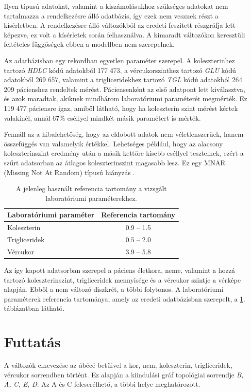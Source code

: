 Ilyen típusú adatokat, valamint a kiszámolásukhoz szükséges adatokat nem tartalmazza a rendelkezésre álló adatbázis, így ezek nem vesznek részt a kísérletben. A rendelkezésre álló változókból az eredeti feszített részgráfja lett képezve, ez volt a kísérletek során felhasználva. A kimaradt változókon keresztüli feltételes függőségek ebben a modellben nem szerepelnek.

Az adatbázisban egy rekordban egyetlen paraméter szerepel. A koleszterinhez tartozó \emph{HDLC} kódú adatokból 177 473, a vércukorszinthez tartozó \emph{GLU} kódú adatokból 269 657, valamint a trigliceridekhez tartozó \emph{TGL} kódú adatokból 264 209 pácienshez rendeltek mérést. Páciensenként az első adatpont lett kiválasztva, és azok maradtak, akiknek mindhárom laboratóriumi paraméterét  megmérték. Ez 119 477 páciensre igaz, amiből látható, hogy ha koleszterin szint mérést kértek valakinél, annál 67\% eséllyel mindkét másik paramétert is mérték.

Fennáll az a hibalehetőség, hogy az eldobott adatok nem véletlenszerűek, hanem összefüggés van valamelyik értékkel. Lehetséges például, hogy az alacsony koleszterinszint eredmény után a másik kettőre kisebb eséllyel tesztelnek, ezért a szűrt adatsorban az átlagos koleszterinszint magasabb lesz. Ez egy MNAR (Missing Not At Random) típusú hiányzás \cite{rubin1976inference}.

\begin{table}[htp]\centering
\begin{tabular}{lc}
    Laboratóriumi paraméter & Referencia tartomány \\ \hline
    Koleszterin             & 0.9 – 1.5            \\
    Trigliceridek           & 0.5 – 2.0            \\
    Vércukor                & 3.9 – 5.8
    \end{tabular}
    \caption{A jelenleg használt referencia tartomány a vizsgált laboratóriumi paraméterekhez.}
    \label{tab:cardio_referencia}
\end{table}

Az így kapott adatsorban szerepel a páciens életkora, neme, valamint a hozzá tartozó koleszterinszint, trigliceridek mennyisége és a vércukor szintje a vérképe alapján. Ebből a nem változó diszkrét, a többi folytonos. A laboratóriumi paraméterek referencia tartománya, amely az eredeti adatbázisban szerepelt, a \ref{tab:cardio_referencia}. táblázatban látható.

\section{Futtatás}
A változók elnevezése az ábécé betűivel a kor, nem, koleszterin, trigliceridek, vércukor sorrendben történt. Ez alapján a kiindulási gráf topológiai sorrendje \emph{B, A, C, E, D}. Az A és C felcserélhető, a többi helye meghatározott.

